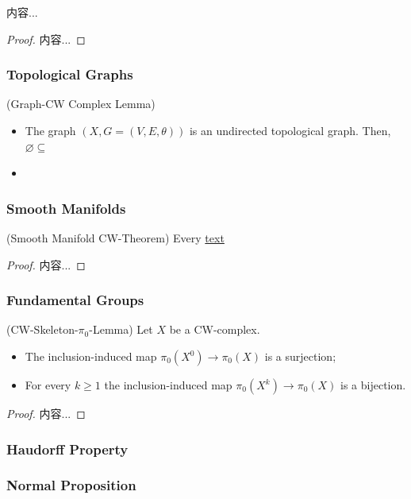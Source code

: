 \documentclass[Total.tex]{subfiles}
\begin{document}
	\begin{lemma}
		内容...
	\end{lemma}
	\begin{proof}
		内容...
	\end{proof}
	\subsubsection{Topological Graphs}
	\begin{lemma}
		(Graph-CW Complex Lemma)
		\begin{itemize}
			\item The graph $(X,G=(V,E,\theta))$ is an undirected topological graph. Then, $\varnothing\subseteq$
			\item 
		\end{itemize}
	\end{lemma}
	\subsubsection{Smooth Manifolds}
	\begin{theorem}
		(Smooth Manifold CW-Theorem) Every \underline{text}
	\end{theorem}
	\begin{proof}
		内容...
	\end{proof}
	
	
	\subsubsection{Fundamental Groups}
	\begin{lemma}
		(CW-Skeleton-$\pi_0$-Lemma)
		Let $X$ be a CW-complex.
		\begin{itemize}
			\item The inclusion-induced map $\pi_0(X^0)\rightarrow \pi_0(X)$ is a surjection;
			\item For every $k\geq 1$ the inclusion-induced map $\pi_0(X^k)\rightarrow \pi_0(X)$ is a bijection.
		\end{itemize}
	\end{lemma}
	\begin{proof}
		内容...
	\end{proof}
	\subsubsection{Haudorff Property}
	\subsubsection{Normal Proposition}
\end{document}
